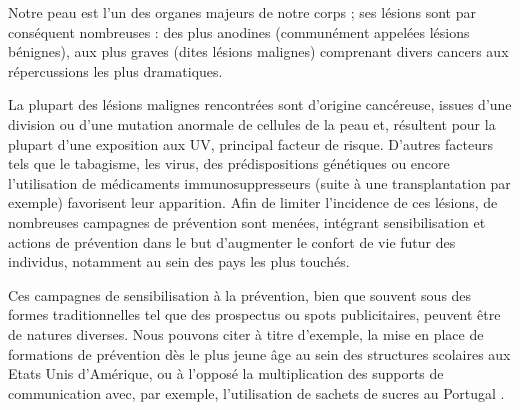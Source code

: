 \renewcommand{\thechapter}{\roman{chapter}}
\setcounter{chapter}{1}

\label{chap:introduction}
Notre peau est l’un des organes majeurs de notre corps ; ses lésions sont par conséquent nombreuses :  des plus anodines (communément appelées lésions bénignes), aux plus graves (dites lésions malignes) comprenant divers cancers aux répercussions les plus dramatiques.\par
La plupart des lésions malignes rencontrées sont d’origine cancéreuse, issues d’une division ou d’une mutation anormale de cellules de la peau et, résultent pour la plupart d’une exposition aux UV, principal facteur de risque.  D’autres facteurs tels que le tabagisme, les virus, des prédispositions génétiques ou encore l’utilisation de médicaments immunosuppresseurs (suite à une transplantation par exemple) favorisent leur apparition. Afin de limiter l’incidence de ces lésions, de nombreuses campagnes de prévention sont menées, intégrant sensibilisation et actions de prévention dans le but d’augmenter le confort de vie futur des individus, notamment au sein des pays les plus touchés.\par
Ces campagnes de sensibilisation à la prévention, bien que souvent sous des formes traditionnelles tel que des prospectus ou spots publicitaires, peuvent être de natures diverses. Nous pouvons citer à titre d’exemple, la mise en place de formations de prévention dès le plus jeune âge au sein des structures scolaires aux Etats Unis d’Amérique, ou à l’opposé la multiplication des supports de communication avec, par exemple, l’utilisation de sachets de sucres au Portugal \cite{Correia2017,Guy2016}.\par 
